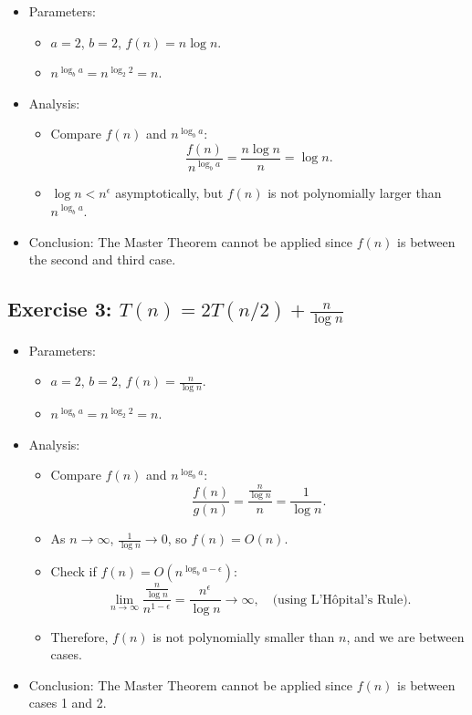 \begin{itemize}
    \item Parameters:
    \begin{itemize}
        \item \(a = 2\), \(b = 2\), \(f(n) = n \log n\).
        \item \(n^{\log_b a} = n^{\log_2 2} = n\).
    \end{itemize}
    \item Analysis:
    \begin{itemize}
        \item Compare \(f(n)\) and \(n^{\log_b a}\):
        \[
        \frac{f(n)}{n^{\log_b a}} = \frac{n \log n}{n} = \log n.
        \]
        \item \(\log n < n^\epsilon\) asymptotically, but \(f(n)\) is not polynomially larger than \(n^{\log_b a}\).
    \end{itemize}
    \item Conclusion: The Master Theorem cannot be applied since \(f(n)\) is between the second and third case.
\end{itemize}

\subsection{Exercise 3: \(T(n) = 2T(n/2) + \frac{n}{\log n}\)}

\begin{itemize}
    \item Parameters:
    \begin{itemize}
        \item \(a = 2\), \(b = 2\), \(f(n) = \frac{n}{\log n}\).
        \item \(n^{\log_b a} = n^{\log_2 2} = n\).
    \end{itemize}
    \item Analysis:
    \begin{itemize}
        \item Compare \(f(n)\) and \(n^{\log_b a}\):
        \[
        \frac{f(n)}{g(n)} = \frac{\frac{n}{\log n}}{n} = \frac{1}{\log n}.
        \]
        \item As \(n \to \infty\), \(\frac{1}{\log n} \to 0\), so \(f(n) = O(n)\).
        \item Check if \(f(n) = O(n^{\log_b a - \epsilon})\):
        \[
        \lim_{n \to \infty} \frac{\frac{n}{\log n}}{n^{1-\epsilon}} = \frac{n^\epsilon}{\log n} \to \infty, \quad \text{(using L'Hôpital's Rule)}.
        \]
        \item Therefore, \(f(n)\) is not polynomially smaller than \(n\), and we are between cases.
    \end{itemize}
    \item Conclusion: The Master Theorem cannot be applied since \(f(n)\) is between cases 1 and 2.
\end{itemize}





